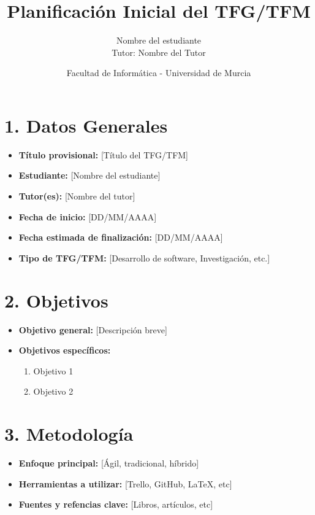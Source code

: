 \documentclass[12pt, a4paper]{article}
\title{\textbf{Planificación Inicial del TFG/TFM}}
\author{Nombre del estudiante \\ Tutor: Nombre del Tutor}
\date{Facultad de Informática - Universidad de Murcia}
\begin{document}
\maketitle

\section*{1. Datos Generales}
\begin{itemize}
    \item \textbf{Título provisional:} [Título del TFG/TFM]
    \item \textbf{Estudiante:} [Nombre del estudiante]
    \item \textbf{Tutor(es):} [Nombre del tutor]
    \item \textbf{Fecha de inicio:} [DD/MM/AAAA]
    \item \textbf{Fecha estimada de finalización:} [DD/MM/AAAA]
    \item \textbf{Tipo de TFG/TFM:} [Desarrollo de software, Investigación, etc.]
\end{itemize}

\section*{2. Objetivos}
\begin{itemize}
    \item \textbf{Objetivo general:} [Descripción breve]
    \item \textbf{Objetivos específicos:}
    \begin{enumerate}
        \item Objetivo 1
        \item Objetivo 2
    \end{enumerate}
\end{itemize}

\section*{3. Metodología}
\begin{itemize}
    \item \textbf{Enfoque principal:} [Ágil, tradicional, híbrido]
    \item \textbf{Herramientas a utilizar:} [Trello, GitHub, LaTeX, etc]
    \item \textbf{Fuentes y refencias clave:} [Libros, artículos, etc]
\end{itemize}
\end{document}
